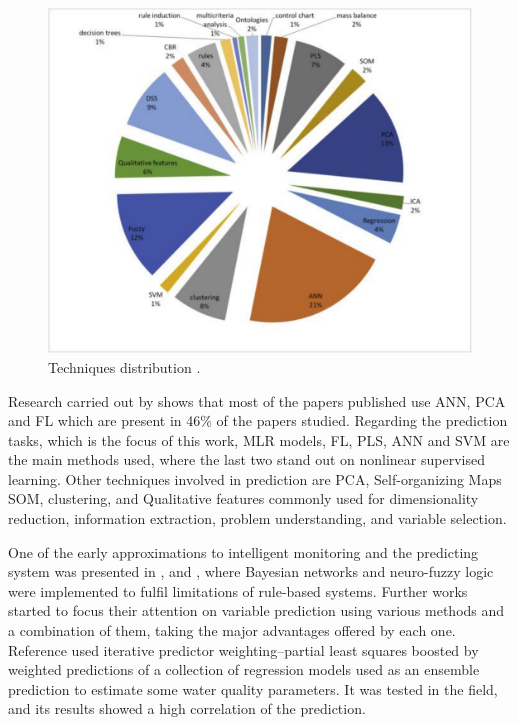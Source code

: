 \begin{figure}[t]
\centering
\includegraphics[width=15cm]{figures/Ch3/Computational-techniques-in-wwtp.pdf}
\caption{Techniques distribution \cite{Corominas2018}.}
\label{f:Techniques-Distribution}
\end{figure}

Research carried out by \cite{Corominas2018} shows that most of the papers published use \ac{ANN}, \ac{PCA} and \ac{FL} which are present in 46\% of the papers studied. Regarding the prediction tasks, which is the focus of this work, \ac{MLR} models, \ac{FL}, \ac{PLS}, \ac{ANN} and \ac{SVM} are the main methods used, where the last two stand out on nonlinear supervised learning. Other techniques involved in prediction are \ac{PCA}, Self-organizing Maps \ac{SOM}, clustering, and Qualitative features commonly used for dimensionality reduction, information extraction, problem understanding, and variable selection.

One of the early approximations to intelligent monitoring and the predicting system was presented in \cite{Sanguesa2000}, and \cite{Haggege2005}, where Bayesian networks and neuro-fuzzy logic were implemented to fulfil limitations of rule-based systems. Further works started to focus their attention on variable prediction using various methods and a combination of them, taking the major advantages offered by each one. Reference \cite{Qin2012} used iterative predictor weighting–partial least squares boosted by weighted predictions of a collection of regression models used as an ensemble prediction to estimate some water quality parameters. It was tested in the field, and its results showed a high correlation of the prediction. 

